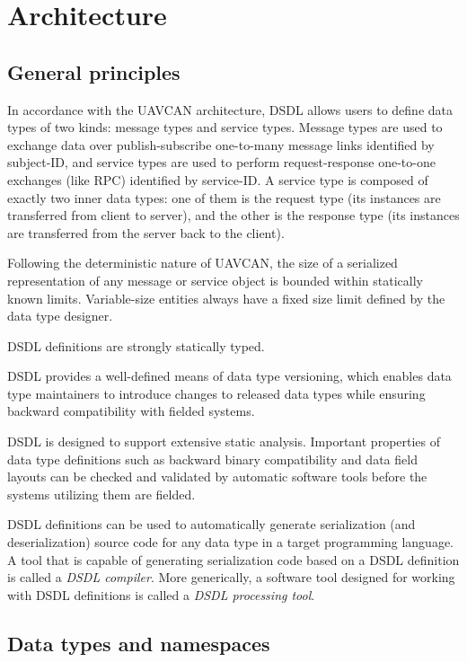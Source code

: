 \section{Architecture}

\subsection{General principles}

In accordance with the UAVCAN architecture, DSDL allows users to define data types of two kinds:
message types and service types.
Message types are used to exchange data over publish-subscribe one-to-many message links identified by subject-ID,
and service types are used to perform request-response one-to-one exchanges (like RPC) identified by service-ID.
A service type is composed of exactly two inner data types:
one of them is the request type (its instances are transferred from client to server),
and the other is the response type (its instances are transferred from the server back to the client).

Following the deterministic nature of UAVCAN, the size of a serialized representation of any
message or service object is bounded within statically known limits.
Variable-size entities always have a fixed size limit defined by the data type designer.

DSDL definitions are strongly statically typed.

DSDL provides a well-defined means of data type versioning, which enables data type maintainers to introduce changes
to released data types while ensuring backward compatibility with fielded systems.

DSDL is designed to support extensive static analysis. Important properties of data type definitions such as
backward binary compatibility and data field layouts can be checked and validated by automatic software tools
before the systems utilizing them are fielded.

DSDL definitions can be used to automatically generate serialization (and deserialization) source code
for any data type in a target programming language.
A tool that is capable of generating serialization code based on a DSDL definition is called a \emph{DSDL compiler}.
More generically, a software tool designed for working with DSDL definitions is called a
\emph{DSDL processing tool}.

\subsection{Data types and namespaces}

